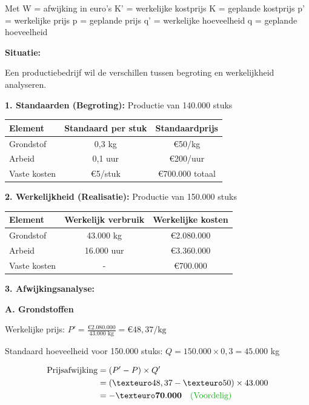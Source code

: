 \documentclass[a4paper,11pt]{article}
\begin{document}
{
Met W = afwijking in euro's
K' = werkelijke kostprijs
K = geplande kostprijs
p' = werkelijke prijs
p = geplande prijs
q' = werkelijke hoeveelheid q = geplande hoeveelheid
}


\begin{oefenblok}[title=Afwijkingsanalyse - Begroting vs Realisatie]
    \textbf{Situatie:}
    
    Een productiebedrijf wil de verschillen tussen begroting en werkelijkheid analyseren.
    
    \textbf{1. Standaarden (Begroting):} Productie van 140.000 stuks
    
    \begin{tabular}{lcc}
    \hline
    \textbf{Element} & \textbf{Standaard per stuk} & \textbf{Standaardprijs} \\
    \hline
    Grondstof & 0,3 kg & €50/kg \\
    Arbeid & 0,1 uur & €200/uur \\
    Vaste kosten & €5/stuk & €700.000 totaal \\
    \hline
    \end{tabular}
    
    \textbf{2. Werkelijkheid (Realisatie):} Productie van 150.000 stuks
    
    \begin{tabular}{lcc}
    \hline
    \textbf{Element} & \textbf{Werkelijk verbruik} & \textbf{Werkelijke kosten} \\
    \hline
    Grondstof & 43.000 kg & €2.080.000 \\
    Arbeid & 16.000 uur & €3.360.000 \\
    Vaste kosten & - & €700.000 \\
    \hline
    \end{tabular}
    
    \textbf{3. Afwijkingsanalyse:}
    
    \textbf{A. Grondstoffen}
    
    Werkelijke prijs: $P' = \frac{€2.080.000}{43.000\text{ kg}} = €48,37/\text{kg}$
    
    Standaard hoeveelheid voor 150.000 stuks: $Q = 150.000 \times 0,3 = 45.000$ kg
    
    \begin{align*}
    \text{Prijsafwijking} &= (P' - P) \times Q' \\
    &= (€48,37 - €50) \times 43.000 \\
    &= \mathbf{-€70.000} \quad \text{\textcolor{green!70!black}{(Voordelig)}}
    \end{align*}
    

\end{oefenblok}
\end{document}
